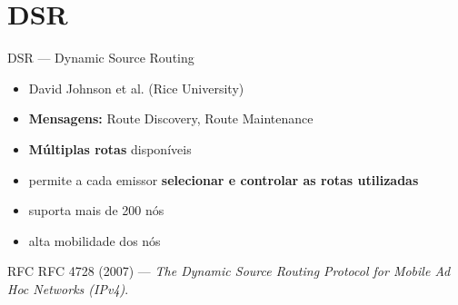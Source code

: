 \documentclass[aspectratio=169,11pt]{beamer}
\begin{document}
\section{DSR}

\begin{frame}{DSR --- Dynamic Source Routing}
  \begin{itemize}
    \item David Johnson et al. (Rice University)
    \item \textbf{Mensagens:} Route Discovery, Route Maintenance
    \item \textbf{Múltiplas rotas} disponíveis
    \item permite a cada emissor \textbf{selecionar e controlar as rotas utilizadas}
    \item suporta mais de 200 nós
    \item alta mobilidade dos nós
  \end{itemize}
  \begin{exampleblock}{RFC}
    RFC 4728 (2007) --- \emph{The Dynamic Source Routing Protocol for Mobile Ad Hoc Networks (IPv4)}.
  \end{exampleblock}
\end{frame}
\end{document}

